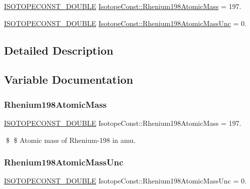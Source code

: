 \begin{DoxyCompactItemize}
\item 
\mbox{\hyperlink{group___isotope_const-_macros_ga8f45a7272ce02c0b4c65c44636ed719a}{I\+S\+O\+T\+O\+P\+E\+C\+O\+N\+S\+T\+\_\+\+D\+O\+U\+B\+LE}} \mbox{\hyperlink{group___isotope_const-_rhenium-_re198_ga4c3d94fd58de185e4b41a2140a1aeef8}{Isotope\+Const\+::\+Rhenium198\+Atomic\+Mass}} = 197.
\item 
\mbox{\hyperlink{group___isotope_const-_macros_ga8f45a7272ce02c0b4c65c44636ed719a}{I\+S\+O\+T\+O\+P\+E\+C\+O\+N\+S\+T\+\_\+\+D\+O\+U\+B\+LE}} \mbox{\hyperlink{group___isotope_const-_rhenium-_re198_ga1093c018214263f15085b1c3e0d06ac6}{Isotope\+Const\+::\+Rhenium198\+Atomic\+Mass\+Unc}} = 0.
\end{DoxyCompactItemize}


\subsection{Detailed Description}


\subsection{Variable Documentation}
\mbox{\label{group___isotope_const-_rhenium-_re198_ga4c3d94fd58de185e4b41a2140a1aeef8}} 
\subsubsection{\texorpdfstring{Rhenium198\+Atomic\+Mass}{Rhenium198AtomicMass}}
{\footnotesize\ttfamily \mbox{\hyperlink{group___isotope_const-_macros_ga8f45a7272ce02c0b4c65c44636ed719a}{I\+S\+O\+T\+O\+P\+E\+C\+O\+N\+S\+T\+\_\+\+D\+O\+U\+B\+LE}} Isotope\+Const\+::\+Rhenium198\+Atomic\+Mass = 197.}

\$ \$ Atomic mass of Rhenium-\/198 in amu. \mbox{\label{group___isotope_const-_rhenium-_re198_ga1093c018214263f15085b1c3e0d06ac6}} 
\subsubsection{\texorpdfstring{Rhenium198\+Atomic\+Mass\+Unc}{Rhenium198AtomicMassUnc}}
{\footnotesize\ttfamily \mbox{\hyperlink{group___isotope_const-_macros_ga8f45a7272ce02c0b4c65c44636ed719a}{I\+S\+O\+T\+O\+P\+E\+C\+O\+N\+S\+T\+\_\+\+D\+O\+U\+B\+LE}} Isotope\+Const\+::\+Rhenium198\+Atomic\+Mass\+Unc = 0.}

